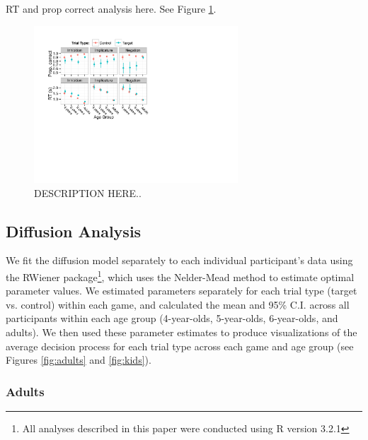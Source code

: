\documentclass[10pt,letterpaper]{article}
\begin{document}
RT and prop correct analysis here.  See Figure \ref{fig:traditional}.

\begin{figure}
\begin{center} 
\includegraphics[width=3in]{figures/correct_RT.pdf}
\caption{\label{fig:traditional} DESCRIPTION HERE..}
\end{center} 
\end{figure}

\subsection{Diffusion Analysis}

We fit the diffusion model separately to each individual participant's data using the RWiener package\footnote{All analyses described in this paper were conducted using R version 3.2.1}, which uses the Nelder-Mead method to estimate optimal parameter values.  We estimated parameters separately for each trial type (target vs. control) within each game, and calculated the mean and 95\% C.I. across all participants within each age group (4-year-olds, 5-year-olds, 6-year-olds, and adults).  We then used these parameter estimates to produce visualizations of the average decision process for each trial type across each game and age group (see Figures \ref{fig:adults} and \ref{fig:kids}).  

\subsubsection{Adults}
\end{document}
